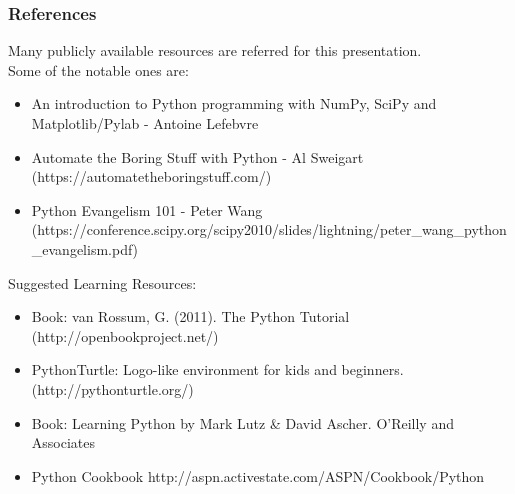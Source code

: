 \begin{frame}\frametitle{References}
Many publicly available resources are referred for this presentation. \\

\scriptsize
Some of the notable ones are:
\begin{itemize}
\item An introduction to Python programming with NumPy, SciPy and Matplotlib/Pylab - Antoine Lefebvre
\item Automate the Boring Stuff with Python - Al Sweigart (https://automatetheboringstuff.com/)
\item Python Evangelism 101 - Peter Wang (https://conference.scipy.org/scipy2010/slides/lightning/peter\_wang\_python\_evangelism.pdf)
\end{itemize}
Suggested Learning Resources:
\begin{itemize}
\item Book: van Rossum, G. (2011). The Python Tutorial (http://openbookproject.net/)
\item PythonTurtle: Logo-like environment for kids and beginners. (http://pythonturtle.org/)
\item Book: Learning Python by Mark Lutz \& David Ascher. O'Reilly and Associates
\item Python Cookbook http://aspn.activestate.com/ASPN/Cookbook/Python
\end{itemize}
\end{frame}
